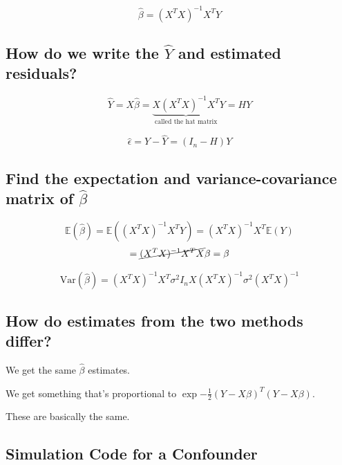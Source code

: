 \documentclass[
  letterpaper,
  DIV=11,
  numbers=noendperiod]{scrreport}
\begin{document}
\[ \hat \beta = (X^TX)^{-1}X^TY\]

\hypertarget{how-do-we-write-the-hat-y-and-estimated-residuals}{%
\subsection{\texorpdfstring{How do we write the \(\hat Y\) and estimated
residuals?}{How do we write the \textbackslash hat Y and estimated residuals?}}\label{how-do-we-write-the-hat-y-and-estimated-residuals}}

\[\hat Y = X \hat \beta = \underbrace{X(X^TX)^{-1}X^T}_{\text{called the hat matrix}}Y = HY\]

\[\hat \epsilon = Y - \hat Y = (I_n - H)Y\]

\hypertarget{find-the-expectation-and-variance-covariance-matrix-of-hat-beta}{%
\subsection{\texorpdfstring{Find the expectation and variance-covariance
matrix of
\(\hat \beta\)}{Find the expectation and variance-covariance matrix of \textbackslash hat \textbackslash beta}}\label{find-the-expectation-and-variance-covariance-matrix-of-hat-beta}}

\[\mathbb E(\hat \beta) = \mathbb E((X^TX)^{-1}X^TY) = (X^TX)^{-1}X^T \mathbb E(Y)\]
\[ = \cancel{(X^TX)^{-1}X^TX} \beta = \beta\]

\[\text{Var}(\hat \beta) = (X^TX)^{-1}X^T \sigma^2 I_n X(X^TX)^{-1} \sigma^2 (X^TX)^{-1}\]

\hypertarget{how-do-estimates-from-the-two-methods-differ}{%
\subsection{How do estimates from the two methods
differ?}\label{how-do-estimates-from-the-two-methods-differ}}

We get the same \(\hat \beta\) estimates.

We get something that's proportional to
\(\exp{-\frac{1}{2}(Y-X\beta)^T(Y-X\beta)}\).

These are basically the same.

\hypertarget{simulation-code-for-a-confounder}{%
\subsection{Simulation Code for a
Confounder}\label{simulation-code-for-a-confounder}}
\end{document}
